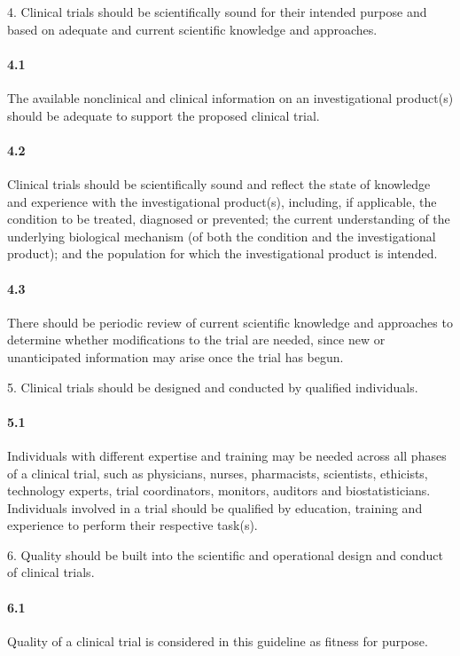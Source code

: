 \documentclass[11pt]{article}
\begin{document}
4. Clinical trials should be scientifically sound for their intended purpose and based on adequate and current scientific knowledge and approaches.


\paragraph{4.1} The available nonclinical and clinical information on an investigational product(s) should be adequate to support the proposed clinical trial.

\paragraph{4.2} Clinical trials should be scientifically sound and reflect the state of knowledge and experience with the investigational product(s), including, if applicable, the condition to be treated, diagnosed or prevented; the current understanding of the underlying biological mechanism (of both the condition and the investigational product); and the population for which the investigational product is intended.

\paragraph{4.3} There should be periodic review of current scientific knowledge and approaches to determine whether modifications to the trial are needed, since new or unanticipated information may arise once the trial has begun.

5. Clinical trials should be designed and conducted by qualified individuals.


\paragraph{5.1} Individuals with different expertise and training may be needed across all phases of a clinical trial, such as physicians, nurses, pharmacists, scientists, ethicists, technology experts, trial coordinators, monitors, auditors and biostatisticians. Individuals involved in a trial should be qualified by education, training and experience to perform their respective task(s).

6. Quality should be built into the scientific and operational design and conduct of clinical trials.


\paragraph{6.1} Quality of a clinical trial is considered in this guideline as fitness for purpose.
\end{document}
